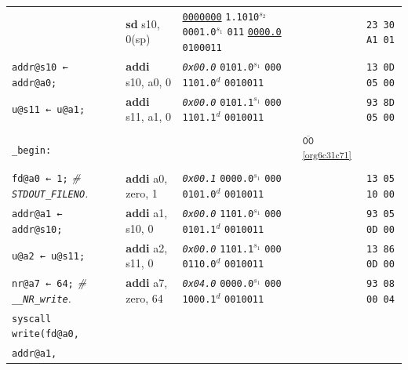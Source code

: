 \documentclass[a4paper,12pt,final]{article}
\begin{document}
\begin{table}[!htbp]
\begin{adjustwidth}{-1cm}{-1cm}
\begin{center}
\begin{tabular}{l|ll|l|l}
 & \textbf{sd} s10, 0(sp) & \uline{\texttt{0000000}} \texttt{1.1010}​\(^{s_{2}}\) \texttt{0001.0}​\(^{s_{1}}\) \texttt{011} \uline{\texttt{0000.0}} \texttt{0100011} &  & \texttt{23 30 A1 01}\\[0pt]
\hspace{1em} \texttt{addr@s10 ← addr@a0;} & \textbf{addi} s10, a0, 0 & \emph{\texttt{0x00.0}}                    \texttt{0101.0}​\(^{s_{1}}\) \texttt{000} \texttt{1101.0}​\(^{d}\)  \texttt{0010011} &  & \texttt{13 0D 05 00}\\[0pt]
\hspace{1em} \texttt{u@s11 ← u@a1;} & \textbf{addi} s11, a1, 0 & \emph{\texttt{0x00.0}}                    \texttt{0101.1}​\(^{s_{1}}\) \texttt{000} \texttt{1101.1}​\(^{d}\)  \texttt{0010011} &  & \texttt{93 8D 05 00}\\[0pt]
 &  &  &  & \\[0pt]
\texttt{\_begin:} &  &  & \(\overline{\texttt{00}}\)\textsuperscript{\ref{org6c31c71}} & \\[0pt]
\hspace{1em} \texttt{fd@a0 ← 1;}  \emph{\# \texttt{STDOUT\_FILENO}.} & \textbf{addi} a0, zero, 1 & \emph{\texttt{0x00.1}}                    \texttt{0000.0}​\(^{s_{1}}\) \texttt{000} \texttt{0101.0}​\(^{d}\)  \texttt{0010011} &  & \texttt{13 05 10 00}\\[0pt]
\hspace{1em} \texttt{addr@a1 ← addr@s10;} & \textbf{addi} a1, s10, 0 & \emph{\texttt{0x00.0}}                    \texttt{1101.0}​\(^{s_{1}}\) \texttt{000} \texttt{0101.1}​\(^{d}\)  \texttt{0010011} &  & \texttt{93 05 0D 00}\\[0pt]
\hspace{1em} \texttt{u@a2 ← u@s11;} & \textbf{addi} a2, s11, 0 & \emph{\texttt{0x00.0}}                    \texttt{1101.1}​\(^{s_{1}}\) \texttt{000} \texttt{0110.0}​\(^{d}\)  \texttt{0010011} &  & \texttt{13 86 0D 00}\\[0pt]
\hspace{1em} \texttt{nr@a7 ← 64;}  \emph{\# \texttt{\_\_NR\_write}.} & \textbf{addi} a7, zero, 64 & \emph{\texttt{0x04.0}}                    \texttt{0000.0}​\(^{s_{1}}\) \texttt{000} \texttt{1000.1}​\(^{d}\)  \texttt{0010011} &  & \texttt{93 08 00 04}\\[0pt]
\hspace{1em} \texttt{syscall write(fd@a0,} &  &  &  & \\[0pt]
\hspace{1em}\hspace{7.371000em}    \texttt{addr@a1,} &  &  &  & \\[0pt]

\end{tabular}
\end{center}
\end{adjustwidth}
\end{table}
\end{document}
